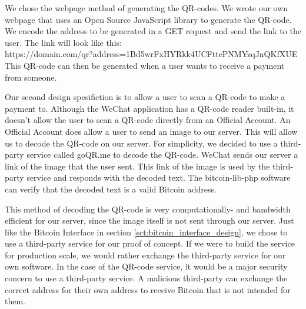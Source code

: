 We chose the webpage method of generating the QR-codes. We wrote our own webpage that uses an Open Source JavaScript library to generate the QR-code. We encode the address to be generated in a GET request and send the link to the user. The link will look like this: \\https://domain.com/qr?address=1Bd5wrFxHYRkk4UCFttcPNMYzqJnQKfXUE\\This QR-code can then be generated when a user wants to receive a payment from someone.


Our second design spesifiction is to allow a user to scan a QR-code to make a payment to. Although the WeChat application has a QR-code reader built-in, it doesn't allow the user to scan a QR-code directly from an Official Account. An Official Account does allow a user to send an image to our server. This will allow us to decode the QR-code on our server. For simplicity, we decided to use a third-party service called goQR.me to decode the QR-code. WeChat sends our server a link of the image that the user sent. This link of the image is used by the third-party service and responds with the decoded text. The bitcoin-lib-php software can verify that the decoded text is a valid Bitcoin address.

This method of decoding the QR-code is very computationally- and bandwidth efficient for our server, since the image itself is not sent through our server. Just like the Bitcoin Interface in section \ref{sct:bitcoin_interface_design}, we chose to use a third-party service for our proof of concept. If we were to build the service for production scale, we would rather exchange the third-party service for our own software. In the case of the QR-code service, it would be a major security concern to use a third-party service. A malicious third-party can exchange the correct address for their own address to receive Bitcoin that is not intended for them.








